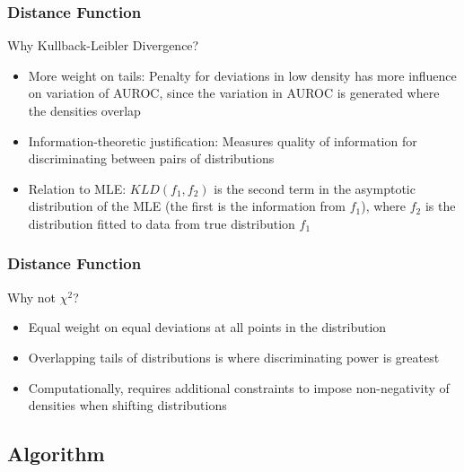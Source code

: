 \documentclass{beamer}
\begin{document}

\begin{frame}
\frametitle{Distance Function}

Why Kullback-Leibler Divergence?
\begin{itemize}
    \item More weight on tails: Penalty for deviations in low density has more influence on variation of AUROC, since the variation in AUROC is generated where the densities overlap
    \item Information-theoretic justification: Measures quality of information for discriminating between pairs of distributions
    \item Relation to MLE: $KLD(f_1, f_2)$ is the second term in the asymptotic distribution of the MLE (the first is the information from $f_1$), where $f_2$ is the distribution fitted to data from true distribution $f_1$
\end{itemize}

\end{frame}


\begin{frame}
\frametitle{Distance Function}

Why not $\chi^2$?
\begin{itemize}
    \item Equal weight on equal deviations at all points in the distribution
    \item Overlapping tails of distributions is where discriminating power is greatest
    \item Computationally, requires additional constraints to impose non-negativity of densities when shifting distributions
\end{itemize}

\end{frame}



\subsection{Algorithm}



%
%
\end{document}

